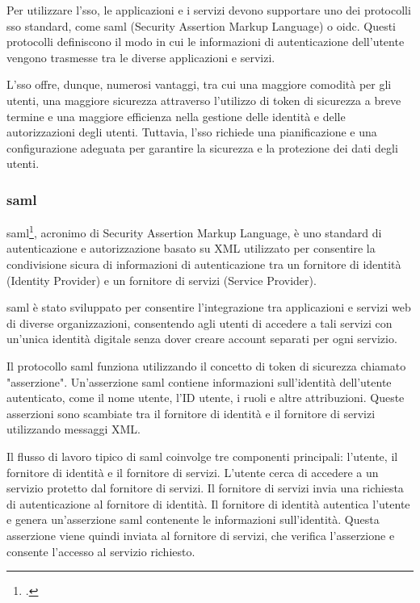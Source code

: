 Per utilizzare l'\acrshort{sso}, le applicazioni e i servizi devono supportare uno dei protocolli \acrshort{sso} standard, come \acrshort{saml} (Security Assertion Markup Language) o \acrshort{oidc}. Questi protocolli definiscono il modo in cui le informazioni di autenticazione dell'utente vengono trasmesse tra le diverse applicazioni e servizi.

L'\acrshort{sso} offre, dunque, numerosi vantaggi, tra cui una maggiore comodità per gli utenti, una maggiore sicurezza attraverso l'utilizzo di token di sicurezza a breve termine e una maggiore efficienza nella gestione delle identità e delle autorizzazioni degli utenti. Tuttavia, l'\acrshort{sso} richiede una pianificazione e una configurazione adeguata per garantire la sicurezza e la protezione dei dati degli utenti.

\subsubsection{\acrlong{saml}}

\acrshort{saml}\footcite{site:saml}, acronimo di Security Assertion Markup Language, è uno standard di autenticazione e autorizzazione basato su XML utilizzato per consentire la condivisione sicura di informazioni di autenticazione tra un fornitore di identità (Identity Provider) e un fornitore di servizi (Service Provider).

\acrshort{saml} è stato sviluppato per consentire l'integrazione tra applicazioni e servizi web di diverse organizzazioni, consentendo agli utenti di accedere a tali servizi con un'unica identità digitale senza dover creare account separati per ogni servizio.

Il protocollo \acrshort{saml} funziona utilizzando il concetto di token di sicurezza chiamato "asserzione". Un'asserzione \acrshort{saml} contiene informazioni sull'identità dell'utente autenticato, come il nome utente, l'ID utente, i ruoli e altre attribuzioni. Queste asserzioni sono scambiate tra il fornitore di identità e il fornitore di servizi utilizzando messaggi XML.

Il flusso di lavoro tipico di \acrshort{saml} coinvolge tre componenti principali: l'utente, il fornitore di identità e il fornitore di servizi. L'utente cerca di accedere a un servizio protetto dal fornitore di servizi. Il fornitore di servizi invia una richiesta di autenticazione al fornitore di identità. Il fornitore di identità autentica l'utente e genera un'asserzione \acrshort{saml} contenente le informazioni sull'identità. Questa asserzione viene quindi inviata al fornitore di servizi, che verifica l'asserzione e consente l'accesso al servizio richiesto.

